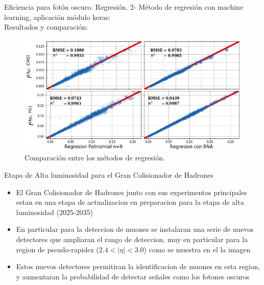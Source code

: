 \begin{frame}{Eficiencia para fot\'on oscuro. Regresi\'on.}
2- M\'etodo de regresi\'on con machine learning, aplicaci\'on m\'odulo keras:\\
Resultados y comparaci\'on:
\begin{figure}
\centering
\includegraphics[width=1\textwidth]{Imag/regresion2.png}
\caption{Comparaci\'on entre los m\'etodos de regresi\'on.}
\end{figure}

\end{frame}


\begin{frame}{Etapa de Alta luminosidad para el Gran Colisionador de Hadrones}
    \begin{itemize}
        \item El Gran Colisionador de Hadrones junto con sus experimentos principales estan en una etapa de actualizacion en preparacion para la etapa de alta luminosidad (2025-2035) 
        \item En particular para la deteccion de muones se instalaran una serie de nuevos detectores que ampliaran el rango de deteccion, muy en particular para la region de pseudo-rapidez ($2.4<|\eta|<3.0$) como se muestra en el la imagen
        \item Estos nuevos detectores permitiran la identificacion de muones en esta region, y aumentaran la probabilidad de detectar se\~nales como los fotones oscuros
    \end{itemize}
\end{frame}



